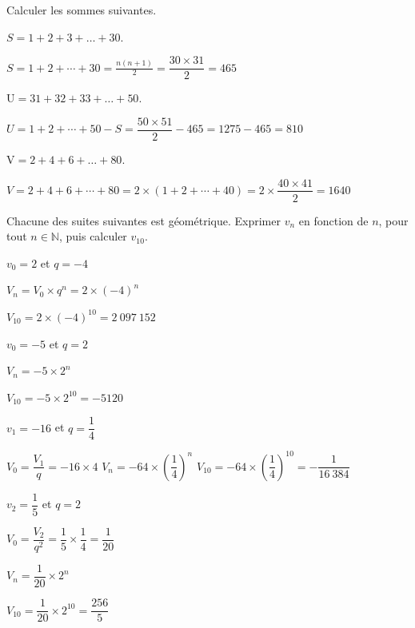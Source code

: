 \documentclass[12pt,a4paper]{article}  %
\begin{document}


Calculer les sommes suivantes.
	\begin{enumMet}
		\item $S=1+2+3+\ldots+30$.
		\begin{corrBox}
			$S=1+2+\cdots+30=\frac{n(n+1)}{2}=\dfrac{30 \times 31}{2}=465$		
		\end{corrBox}
		\item $\mathrm{U}=31+32+33+\ldots+50$.
		\begin{corrBox}
			$U=1+2+\cdots+50-S=\dfrac{50 \times 51}{2}-465=1275-465=810$
		\end{corrBox}
		\item $\mathrm{V}=2+4+6+\ldots+80$.
		\begin{corrBox}
			$V=2+4+6+\cdots+80=2 \times(1+2+\cdots+40)=2 \times \dfrac{40 \times 41}{2}=1640$		
		\end{corrBox}
	\end{enumMet}




Chacune des suites suivantes est géométrique. Exprimer $v_n$ en fonction de $n$, pour tout $n \in \mathbb{N}$, puis calculer $v_{10}$.
	\begin{enumMet}
		\item $v_0=2$ et $q=-4$
			\begin{corrBox}
				$V_n=V_0 \times q^n=2 \times(-4)^n$
				
				$V_{10}=2 \times(-4)^{10}=2\ 097\ 152$		
			\end{corrBox}
		\item $v_0=-5$ et $q=2$
		\begin{corrBox}
			$V_n=-5 \times 2^n $
			
			$V_{10}=-5 \times 2^{10}=-5120$		
		\end{corrBox}
		\item $v_1=-16$ et $q=\dfrac{1}{4}$
		\begin{corrBox}
			$V_0=\dfrac{V_1}{q}=-16 \times 4$
			$V_n=-64 \times\left(\dfrac{1}{4}\right)^n$
			$V_{10}=-64 \times\left(\dfrac{1}{4}\right)^{10}=-\dfrac{1}{16\ 384}$		
		\end{corrBox}
		\item {} $v_{2}=\dfrac{1}{5}$ et $q=2$
		\begin{corrBox}
			$V_0=\dfrac{V_2}{q^2}=\dfrac{1}{5} \times \dfrac{1}{4}=\dfrac{1}{20}$
			
			$V_n=\dfrac{1}{20}\times 2^n$
			
			$V_{10}=\dfrac{1}{20}\times 2^{10}=\dfrac{256}{5}$		
		\end{corrBox}
	\end{enumMet}
\end{document}
